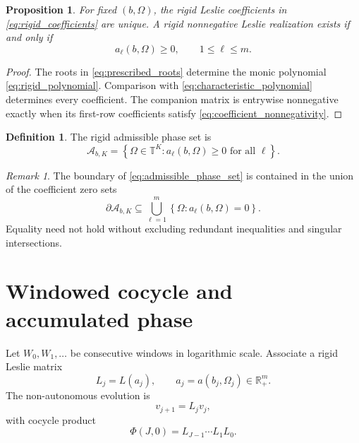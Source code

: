 \documentclass[11pt]{amsart}
\numberwithin{equation}{section}
\theoremstyle{plain}
\newtheorem{proposition}[theorem]{Proposition}
\theoremstyle{definition}
\newtheorem{definition}[theorem]{Definition}
\theoremstyle{remark}
\newtheorem{remark}[theorem]{Remark}
\begin{document}
\begin{proposition}
\label{prop:uniqueness}
For fixed $(b,\Omega)$, the rigid Leslie coefficients in \eqref{eq:rigid_coefficients} are unique.  A rigid nonnegative Leslie realization exists if and only if
\begin{equation}
a_\ell(b,\Omega)\geq0,
\qquad 1\leq\ell\leq m.
\label{eq:coefficient_nonnegativity}
\end{equation}
\end{proposition}

\begin{proof}
The roots in \eqref{eq:prescribed_roots} determine the monic polynomial \eqref{eq:rigid_polynomial}.  Comparison with \eqref{eq:characteristic_polynomial} determines every coefficient.  The companion matrix is entrywise nonnegative exactly when its first-row coefficients satisfy \eqref{eq:coefficient_nonnegativity}.
\end{proof}

\begin{definition}
\label{def:admissible_phase_set}
The rigid admissible phase set is
\begin{equation}
\mathcal A_{b,K}
=
\left\{
\Omega\in\mathbb T^K:
 a_\ell(b,\Omega)\geq0
 \text{ for all }\ell
\right\}.
\label{eq:admissible_phase_set}
\end{equation}
\end{definition}

\begin{remark}
\label{rem:boundary}
The boundary of \eqref{eq:admissible_phase_set} is contained in the union of the coefficient zero sets
\begin{equation}
\partial\mathcal A_{b,K}
\subseteq
\bigcup_{\ell=1}^{m}
\left\{\Omega:a_\ell(b,\Omega)=0\right\}.
\label{eq:admissible_boundary}
\end{equation}
Equality need not hold without excluding redundant inequalities and singular intersections.
\end{remark}

\section{Windowed cocycle and accumulated phase}
\label{sec:windowed_cocycle}

Let $W_0,W_1,\ldots$ be consecutive windows in logarithmic scale.  Associate a rigid Leslie matrix
\begin{equation}
L_j=L(a_j),
\qquad
a_j=a(b_j,\Omega_j)\in\mathbb R_+^m.
\label{eq:window_leslie}
\end{equation}
The non-autonomous evolution is
\begin{equation}
v_{j+1}=L_jv_j,
\label{eq:nonautonomous_evolution}
\end{equation}
with cocycle product
\begin{equation}
\Phi(J,0)=L_{J-1}\cdots L_1L_0.
\label{eq:cocycle_product}
\end{equation}
\end{document}
